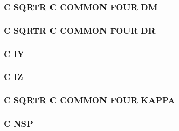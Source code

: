 \hypertarget{four_8com_a52098fe796b882decbac20a67cd7a174}{
\subsubsection[{D\-M}]{\setlength{\rightskip}{0pt plus 5cm}C S\-Q\-R\-T\-R C C\-O\-M\-M\-O\-N F\-O\-U\-R D\-M}}\label{four_8com_a52098fe796b882decbac20a67cd7a174}
\hypertarget{four_8com_abfc8949be769882c767d392a1c43a3d6}{
\subsubsection[{D\-R}]{\setlength{\rightskip}{0pt plus 5cm}C S\-Q\-R\-T\-R C C\-O\-M\-M\-O\-N F\-O\-U\-R D\-R}}\label{four_8com_abfc8949be769882c767d392a1c43a3d6}
\hypertarget{four_8com_aae2e60235ec6f4303575becb746f40ea}{
\subsubsection[{I\-Y}]{\setlength{\rightskip}{0pt plus 5cm}C I\-Y}}\label{four_8com_aae2e60235ec6f4303575becb746f40ea}
\hypertarget{four_8com_ac8f0d60b0a4b9156d24fd433099b8c49}{
\subsubsection[{I\-Z}]{\setlength{\rightskip}{0pt plus 5cm}C I\-Z}}\label{four_8com_ac8f0d60b0a4b9156d24fd433099b8c49}
\hypertarget{four_8com_a6742b6884a0c5a19eb85277ca4dd8d1b}{
\subsubsection[{K\-A\-P\-P\-A}]{\setlength{\rightskip}{0pt plus 5cm}C S\-Q\-R\-T\-R C C\-O\-M\-M\-O\-N F\-O\-U\-R K\-A\-P\-P\-A}}\label{four_8com_a6742b6884a0c5a19eb85277ca4dd8d1b}
\hypertarget{four_8com_aa0cef1d162909c91ecc4ab6954d16e82}{
\subsubsection[{N\-S\-P}]{\setlength{\rightskip}{0pt plus 5cm}C N\-S\-P}}\label{four_8com_aa0cef1d162909c91ecc4ab6954d16e82}
